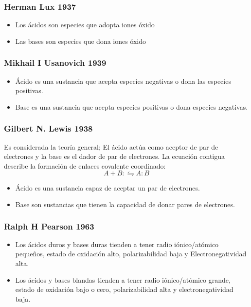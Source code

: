 \subsubsection{Herman Lux 1937}
\begin{itemize}
	\item Los ácidos son especies que adopta iones óxido
	\item Las bases son especies que dona iones óxido
\end{itemize}

\subsubsection{Mikhail I Usanovich 1939}
\begin{itemize}
	\item Ácido es una sustancia que acepta especies negativas o dona las especies positivas.
	\item Base es una sustancia que acepta especies positivas o dona especies negativas.
\end{itemize}

\subsubsection{Gilbert N. Lewis 1938}
\begin{definition}
	Es considerada la teoría general; El ácido actúa como aceptor de par de electrones y la base es el dador de par de electrones. La ecuación contigua describe la formación de enlaces covalente coordinado:
	\begin{equation}
		A+B:  \leftrightharpoons A:B
	\end{equation}
\end{definition}
\begin{itemize}
	\item Ácido es una sustancia capaz de aceptar un par de electrones.
	\item Base son sustancias que tienen la capacidad de donar pares de electrones.
\end{itemize}

\subsubsection{Ralph H Pearson 1963}
\begin{itemize}
	\item Los ácidos duros y bases duras tienden a tener radio iónico/atómico pequeños, estado de oxidación alto, polarizabilidad baja y Electronegatividad alta.
	\item Los ácidos y bases blandas tienden a tener  radio iónico/atómico grande, estado de oxidación bajo o cero, polarizabilidad alta y electronegatividad baja.
\end{itemize}


